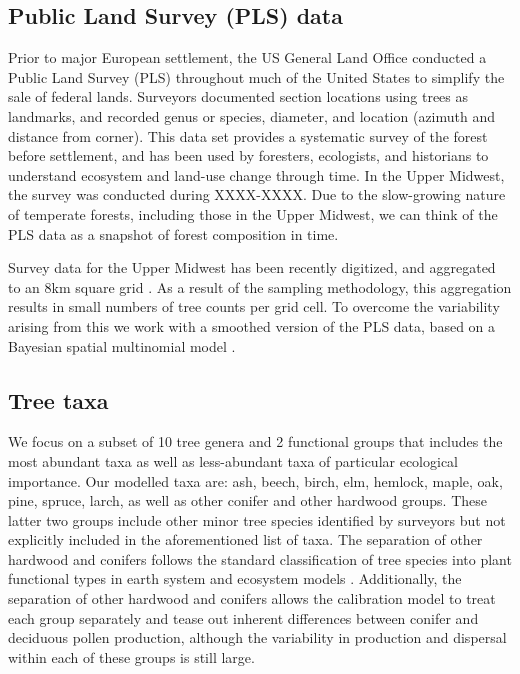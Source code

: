 \documentclass[12pt]{article}
\begin{document}
\subsection{Public Land Survey (PLS) data}

Prior to major European settlement, the US General Land Office
conducted a Public Land Survey (PLS) throughout much of the United
States to simplify the sale of federal lands. Surveyors
documented section locations using trees as landmarks, and recorded
genus or species, diameter, and location (azimuth and distance from
corner). This data set provides a systematic survey of the forest
before settlement, and has been used by foresters, ecologists, and
historians to understand ecosystem and land-use change through
time. In the Upper Midwest, the survey was conducted during
XXXX-XXXX. Due to the slow-growing nature of temperate forests,
including those in the Upper Midwest, we can think of the PLS data as
a snapshot of forest composition in time. 

Survey data for the Upper Midwest has been recently digitized, and
aggregated to an 8km square grid \citep{XXX}. As a result of the
sampling methodology, this aggregation results in small numbers of
tree counts per grid cell. To overcome the variability arising from
this we work with a smoothed version of the PLS data, based on a
Bayesian spatial multinomial model \citep{paciorek_composition}. 

\subsection{Tree taxa}
We focus on a subset of 10 tree genera and 2 functional groups that
includes the most abundant taxa as well as less-abundant taxa of
particular ecological importance. Our modelled taxa are: ash, beech,
birch, elm, hemlock, maple, oak, pine, spruce, larch, as well as other
conifer and other hardwood groups.  These latter two groups include
other minor tree species identified by surveyors but not explicitly
included in the aforementioned list of taxa. The separation of other
hardwood and conifers follows the standard classification of tree
species into plant functional types in earth system and ecosystem
models \citep{cramer2001global, goring2015}. Additionally, the
separation of other hardwood and conifers allows the calibration model
to treat each group separately and tease out inherent differences
between conifer and deciduous pollen production, although the
variability in production and dispersal within each of these groups is
still large.
\end{document}
